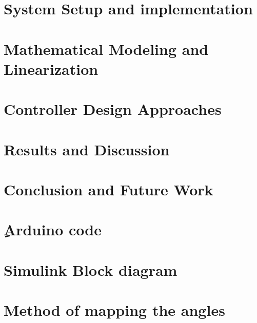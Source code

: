 \documentclass[12pt,oneside]{book}
\begin{document}
\chapter{System Setup and implementation}


\chapter{Mathematical Modeling and Linearization}


\chapter{Controller Design Approaches}


\chapter{Results and Discussion}


\chapter{Conclusion and Future Work}

\begin{singlespace}
\appendix
\chapter{ِArduino code}

\chapter{Simulink Block diagram}

\chapter{Method of mapping the angles}

\end{singlespace}


\end{document}

